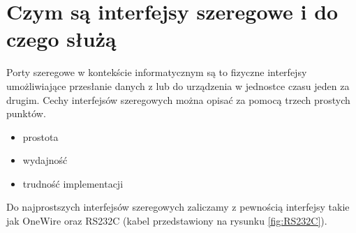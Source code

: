 \documentclass{BscUS}
\begin{document}
\section{Czym są interfejsy szeregowe i do czego służą}
\label{s:serialInterface}
\indent Porty szeregowe w kontekście informatycznym są to fizyczne interfejsy umożliwiające przesłanie danych z lub do urządzenia w jednostce czasu jeden za drugim. Cechy interfejsów szeregowych można opisać za pomocą trzech prostych punktów.
\begin{itemize}
\item prostota
\item wydajność
\item trudność implementacji
\end{itemize}
Do najprostszych interfejsów szeregowych zaliczamy z pewnością interfejsy takie jak OneWire oraz RS232C (kabel przedstawiony na rysunku \ref{fig:RS232C}).
\end{document}

